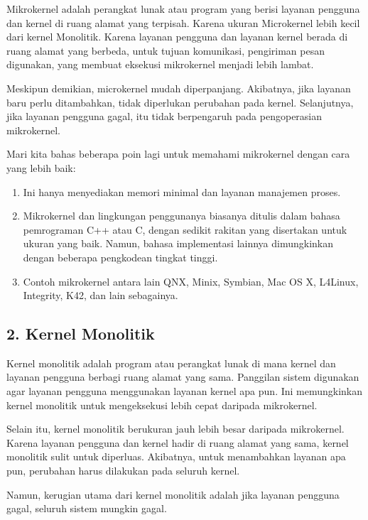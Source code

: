 \documentclass{report}
\begin{document}
	Mikrokernel adalah perangkat lunak atau program yang berisi layanan pengguna dan kernel di ruang alamat yang terpisah. Karena ukuran Microkernel lebih kecil dari kernel Monolitik. Karena layanan pengguna dan layanan kernel berada di ruang alamat yang berbeda, untuk tujuan komunikasi, pengiriman pesan digunakan, yang membuat eksekusi mikrokernel menjadi lebih lambat.
	
	Meskipun demikian, microkernel mudah diperpanjang. Akibatnya, jika layanan baru perlu ditambahkan, tidak diperlukan perubahan pada kernel. Selanjutnya, jika layanan pengguna gagal, itu tidak berpengaruh pada pengoperasian mikrokernel.
	
	Mari kita bahas beberapa poin lagi untuk memahami mikrokernel dengan cara yang lebih baik: 
	
	\begin{enumerate}
		\item Ini hanya menyediakan memori minimal dan layanan manajemen proses.
		
		\item Mikrokernel dan lingkungan penggunanya biasanya ditulis dalam bahasa pemrograman C++ atau C, dengan sedikit rakitan yang disertakan untuk ukuran yang baik. Namun, bahasa implementasi lainnya dimungkinkan dengan beberapa pengkodean tingkat tinggi.
		
		\item Contoh mikrokernel antara lain QNX, Minix, Symbian, Mac OS X, L4Linux, Integrity, K42, dan lain sebagainya.
	\end{enumerate}
	
	\subsection*{2. Kernel Monolitik}
	Kernel monolitik adalah program atau perangkat lunak di mana kernel dan layanan pengguna berbagi ruang alamat yang sama. Panggilan sistem digunakan agar layanan pengguna menggunakan layanan kernel apa pun. Ini memungkinkan kernel monolitik untuk mengeksekusi lebih cepat daripada mikrokernel.
	
	Selain itu, kernel monolitik berukuran jauh lebih besar daripada mikrokernel. Karena layanan pengguna dan kernel hadir di ruang alamat yang sama, kernel monolitik sulit untuk diperluas. Akibatnya, untuk menambahkan layanan apa pun, perubahan harus dilakukan pada seluruh kernel.
	
	Namun, kerugian utama dari kernel monolitik adalah jika layanan pengguna gagal, seluruh sistem mungkin gagal.
	
\end{document}

